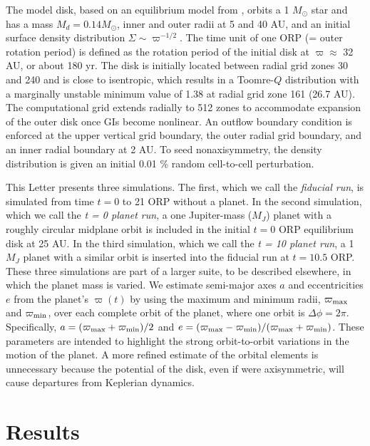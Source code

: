 \documentclass[12pt,manuscript,authoryear]{aastex}
\begin{document}
The model disk, based on an equilibrium model from \citet{pickett2003}, orbits a 1 $M_{\odot}$ star and has a mass $M_d =
0.14 M_{\odot}$, inner and outer radii at 5 and 40 AU, and an initial surface density distribution $\Sigma \sim
\varpi^{-1/2}$. The time unit of one ORP (= outer rotation period) is defined as the rotation period of the initial disk
at $\varpi \approx$ 32 AU, or about 180 yr. The disk is initially located between radial grid zones 30 and 240 and is
close to isentropic, which results in a Toomre-$Q$ distribution with a marginally unstable \citep[see ][]{durisen2007}
minimum value of 1.38 at radial grid zone 161 (26.7 AU). The computational grid extends radially to 512 zones to
accommodate expansion of the outer disk once GIs become nonlinear. An outflow boundary condition is enforced at the
upper vertical grid boundary, the outer radial grid boundary, and an inner radial boundary at 2 AU. To seed
nonaxisymmetry, the density distribution is given an initial 0.01 \% random cell-to-cell perturbation.

This Letter presents three simulations. The first, which we call the {\sl fiducial run}, is simulated from time $t = 0$
to 21 ORP without a planet. In the second simulation, which we call the {\sl t = 0 planet run}, a one Jupiter-mass
($M_J$) planet with a roughly circular midplane orbit is included in the initial $t = 0$ ORP equilibrium disk at 25
AU. In the third simulation, which we call the {\sl t = 10 planet run}, a 1 $M_J$ planet with a similar orbit is
inserted into the fiducial run at $t = 10.5$ ORP. These three simulations are part of a larger suite, to be described
elsewhere, in which the planet mass is varied. We estimate semi-major axes $a$ and eccentricities $e$ from the planet's
$\varpi(t)$ by using the maximum and minimum radii, $\varpi_{\rm max}$ and $\varpi_{\rm min}$, over each complete orbit
of the planet, where one orbit is $\Delta\phi=2\pi$. Specifically, $a = (\varpi_{\rm max}+\varpi_{\rm min})/2$ and $e =
(\varpi_{\rm max}-\varpi_{\rm min})/(\varpi_{\rm max}+\varpi_{\rm min})$. These parameters are intended to highlight the
strong orbit-to-orbit variations in the motion of the planet.  A more refined estimate of the orbital elements is
unnecessary because the potential of the disk, even if were axisymmetric, will cause departures from Keplerian dynamics.

\section{Results}
\end{document}
